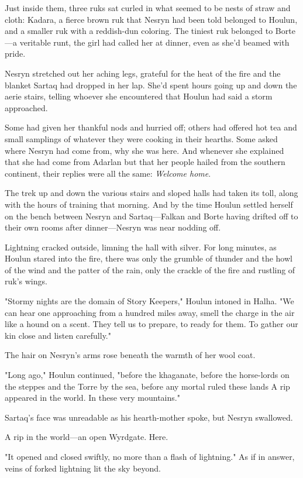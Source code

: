 Just inside them, three ruks sat curled in what seemed to be nests of straw and cloth: Kadara, a fierce brown ruk that Nesryn had been told belonged to Houlun, and a smaller ruk with a reddish-dun coloring. The tiniest ruk belonged to Borte ---a veritable runt, the girl had called her at dinner, even as she'd beamed with pride.

Nesryn stretched out her aching legs, grateful for the heat of the fire and the blanket Sartaq had dropped in her lap. She'd spent hours going up and down the aerie stairs, telling whoever she encountered that Houlun had said a storm approached.

Some had given her thankful nods and hurried off; others had offered hot tea and small samplings of whatever they were cooking in their hearths. Some asked where Nesryn had come from, why she was here. And whenever she explained that she had come from Adarlan but that her people hailed from the southern continent, their replies were all the same:
\emph{Welcome home}.

The trek up and down the various stairs and sloped halls had taken its toll, along with the hours of training that morning. And by the time Houlun settled herself on the bench between Nesryn and Sartaq---Falkan and Borte having drifted off to their own rooms after dinner---Nesryn was near nodding off.

Lightning cracked outside, limning the hall with silver. For long minutes, as Houlun stared into the fire, there was only the grumble of thunder and the howl of the wind and the patter of the rain, only the crackle of the fire and rustling of ruk's wings.

"Stormy nights are the domain of Story Keepers," Houlun intoned in Halha. "We can hear one approaching from a hundred miles away, smell the charge in the air like a hound on a scent. They tell us to prepare, to ready for them. To gather our kin close and listen carefully."

The hair on Nesryn's arms rose beneath the warmth of her wool coat.

"Long ago," Houlun continued, "before the khaganate, before the horse-lords on the steppes and the Torre by the sea, before any mortal ruled these lands  A rip appeared in the world. In these very mountains."

Sartaq's face was unreadable as his hearth-mother spoke, but Nesryn swallowed.

A rip in the world---an open Wyrdgate. Here.

"It opened and closed swiftly, no more than a flash of lightning." As if in answer, veins of forked lightning lit the sky beyond.

